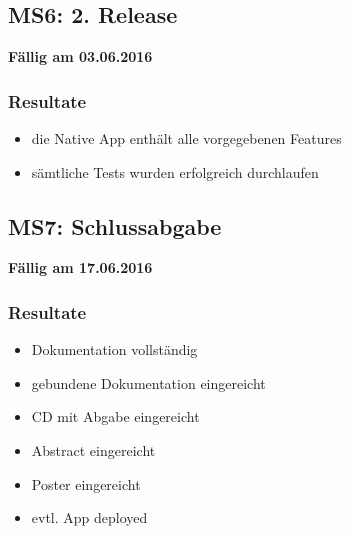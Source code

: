 \subsection{MS6: 2. Release}
\label{pm-ms6}
\textbf{Fällig am 03.06.2016}
\subsubsection{Resultate}
\begin{itemize}
	\item die Native App enthält alle vorgegebenen Features
	\item sämtliche Tests wurden erfolgreich durchlaufen
\end{itemize}

\subsection{MS7: Schlussabgabe}
\label{pm-ms7}
\textbf{Fällig am 17.06.2016}
\subsubsection{Resultate}
\begin{itemize}
	\item Dokumentation vollständig
	\item gebundene Dokumentation eingereicht
	\item CD mit Abgabe eingereicht
	\item Abstract eingereicht
	\item Poster eingereicht
	\item evtl. App deployed
\end{itemize}